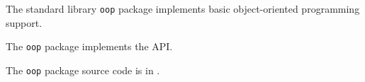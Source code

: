
The standard library {\tt oop} package implements basic object-oriented programming support.

The {\tt oop} package implements the  API.

The {\tt oop} package source code is in .




